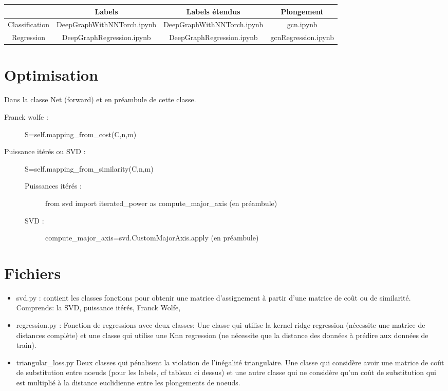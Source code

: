 \documentclass{article}
\begin{document}
\begin{tabular}{|c|c|c|c|}
  \hline
  &Labels&Labels étendus&Plongement\\
  \hline
  Classification&DeepGraphWithNNTorch.ipynb &DeepGraphWithNNTorch.ipynb&gcn.ipynb\\
  \hline
  Regression&DeepGraphRegression.ipynb&DeepGraphRegression.ipynb&gcnRegression.ipynb\\
  \hline
\end{tabular}

\section*{Optimisation}

Dans la classe Net (forward) et en préambule de cette classe.

\begin{description}
\item[Franck wolfe :] S=self.mapping\_from\_cost(C,n,m)
\item[Puissance itérés ou SVD :]S=self.mapping\_from\_similarity(C,n,m)
  \begin{description}
  \item[Puissances itérés :]  from svd import iterated\_power as compute\_major\_axis (en préambule)
    \item[SVD :] compute\_major\_axis=svd.CustomMajorAxis.apply (en préambule)
  \end{description}
\end{description}

\section*{Fichiers}

\begin{itemize}
\item svd.py : contient les classes fonctions pour obtenir une matrice d'assignement à partir d'une matrice de coût ou de similarité. Comprends: la SVD, puissance itérés, Franck Wolfe,
  
\item regression.py : Fonction de regressions avec deux classes: Une classe qui utilise la kernel ridge regression (nécessite une matrice de distances complète) et une classe qui utilise une Knn regression (ne nécessite que la distance des données à prédire aux données de train).
  
\item triangular\_loss.py Deux classes qui pénalisent la violation de l'inégalité triangulaire. Une classe  qui considère avoir une matrice de coût de substitution entre noeuds (pour les labels, cf tableau ci dessus) et une autre classe qui ne considère qu'un coût de substitution qui est multiplié à la distance euclidienne entre les plongements de noeuds.
  
\end{itemize}
\end{document}
